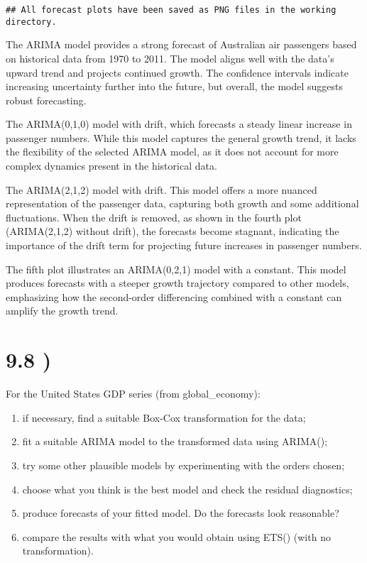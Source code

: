 \documentclass[
]{article}
\providecommand{\tightlist}{%
  \setlength{\itemsep}{0pt}\setlength{\parskip}{0pt}}
\begin{document}
\begin{verbatim}
## All forecast plots have been saved as PNG files in the working directory.
\end{verbatim}

The ARIMA model provides a strong forecast of Australian air passengers
based on historical data from 1970 to 2011. The model aligns well with
the data's upward trend and projects continued growth. The confidence
intervals indicate increasing uncertainty further into the future, but
overall, the model suggests robust forecasting.

The ARIMA(0,1,0) model with drift, which forecasts a steady linear
increase in passenger numbers. While this model captures the general
growth trend, it lacks the flexibility of the selected ARIMA model, as
it does not account for more complex dynamics present in the historical
data.

The ARIMA(2,1,2) model with drift. This model offers a more nuanced
representation of the passenger data, capturing both growth and some
additional fluctuations. When the drift is removed, as shown in the
fourth plot (ARIMA(2,1,2) without drift), the forecasts become stagnant,
indicating the importance of the drift term for projecting future
increases in passenger numbers.

The fifth plot illustrates an ARIMA(0,2,1) model with a constant. This
model produces forecasts with a steeper growth trajectory compared to
other models, emphasizing how the second-order differencing combined
with a constant can amplify the growth trend.

\section{9.8 )}\label{section-6}

For the United States GDP series (from global\_economy):

\begin{enumerate}
\def\labelenumi{\alph{enumi})}
\tightlist
\item
  if necessary, find a suitable Box-Cox transformation for the data;
\item
  fit a suitable ARIMA model to the transformed data using ARIMA();
\item
  try some other plausible models by experimenting with the orders
  chosen;
\item
  choose what you think is the best model and check the residual
  diagnostics;
\item
  produce forecasts of your fitted model. Do the forecasts look
  reasonable?
\item
  compare the results with what you would obtain using ETS() (with no
  transformation).
\end{enumerate}
\end{document}
